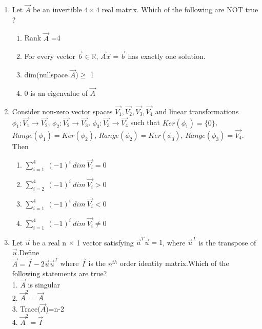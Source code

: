 \begin{enumerate}[label=\thesection.\arabic*.,ref=\thesection.\theenumi]
\item Let $\vec{A}$ be an invertible $4 \times 4$ real matrix. Which of the following are NOT true ? 
\begin{enumerate}
\item  Rank $\vec{A}$ =4
\item For every vector $\vec{b} \in \mathbb{R}$, $\vec{A}\vec{x}=\vec{b}$ has exactly one solution. 
\item dim(nullspace $\vec{A}$)$\geq$ 1
\item 0 is an eigenvalue of $\vec{A}$
\end{enumerate}
%
\solution

\item 	Consider non-zero vector spaces $\vec{V_1}, \vec{V_2}, \vec{V_3}, \vec{V_4}$ and linear transformations $\phi_1 : \vec{V_1} \rightarrow \vec{V_2}$, $\phi_2 : \vec{V_2} \rightarrow \vec{V_3}$, $\phi_3 : \vec{V_3} \rightarrow \vec{V_4}$ such that $Ker(\phi_1) = \{0\}$, $Range(\phi_1) = Ker(\phi_2)$, $Range(\phi_2) = Ker(\phi_3)$, $Range(\phi_3) = \vec{V_4}$. Then \\
	
	\begin{enumerate}
		\item $\sum_{i=1}^{4} \ (-1)^{i} \ dim \ \vec{V_i} = 0$ \\
		\item $\sum_{i=2}^{4} \ (-1)^{i} \ dim \ \vec{V_i} > 0$ \\
		\item $\sum_{i=1}^{4} \ (-1)^{i} \ dim \ \vec{V_i} < 0$ \\
		\item $\sum_{i=1}^{4} \ (-1)^{i} \ dim \ \vec{V_i} \neq 0$
	\end{enumerate}
%
\solution

\item Let $\vec{u}$ be a real n $\times$ 1 vector satisfying $\vec{u}^T\vec{u}=1$, where $\vec{u}^T$ is the transpose of $\vec{u}$.Define\\
$\vec{A}=\vec{I}-2\vec{u}\vec{u}^T$ where $\vec{I}$ is the $n^{th}$ order identity matrix.Which of the following statements are true?\\
1. $\vec{A}$ is singular\\
2. $\vec{A}^2=\vec{A}$\\
3. Trace($\vec{A}$)=n-2\\
4. $\vec{A}^2=\vec{I}$\\
%
\solution


\end{enumerate}
